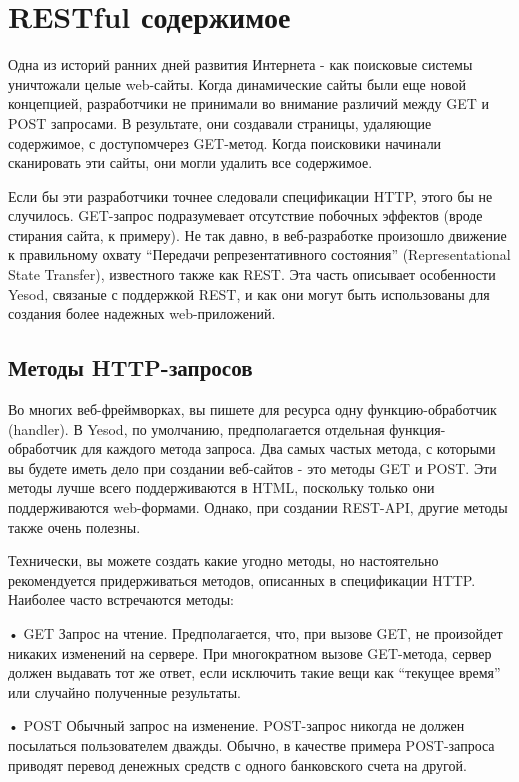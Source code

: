 \section{RESTful содержимое}

Одна из историй ранних дней развития Интернета - как поисковые системы уничтожали целые web-сайты. Когда динамические сайты были еще новой концепцией, разработчики не принимали во внимание различий между GET и POST запросами. В результате, они создавали страницы, удаляющие содержимое, с доступомчерез GET-метод. Когда поисковики начинали сканировать эти сайты, они могли удалить все содержимое.

Если бы эти разработчики точнее следовали спецификации HTTP, этого бы не случилось. GET-запрос подразумевает отсутствие побочных эффектов (вроде стирания сайта, к примеру). Не так давно, в веб-разработке произошло движение к правильному охвату “Передачи репрезентативного состояния” (Representational State Transfer), известного также как REST. Эта часть описывает особенности Yesod, связаные с поддержкой REST, и как они могут быть использованы для создания более надежных web-приложений.

\subsection{Методы HTTP-запросов}

Во многих веб-фреймворках, вы пишете для ресурса одну функцию-обработчик (handler). В Yesod, по умолчанию, предполагается отдельная функция-обработчик для каждого метода запроса. Два самых частых метода, с которыми вы будете иметь дело при создании веб-сайтов - это методы GET и POST. Эти методы лучше всего поддерживаются в HTML, поскольку только они поддерживаются web-формами. Однако, при создании REST-API, другие методы также очень полезны.

Технически, вы можете создать какие угодно методы, но настоятельно рекомендуется придерживаться методов, описанных в спецификации HTTP. Наиболее часто встречаются методы:

• GET
Запрос на чтение. Предполагается, что, при вызове GET, не произойдет никаких изменений на сервере. При многократном вызове GET-метода, сервер должен выдавать тот же ответ, если исключить такие вещи как “текущее время” или случайно полученные результаты.

• POST
Обычный запрос на изменение. POST-запрос никогда не должен посылаться пользователем дважды. Обычно, в качестве примера POST-запроса приводят перевод денежных средств с одного банковского счета на другой.

